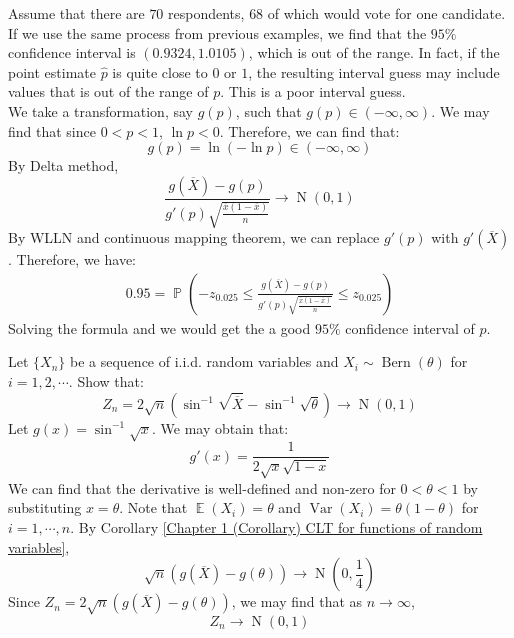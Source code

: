 \documentclass{huhtakm-template-book-v2}
\DeclareMathOperator{\prob}{\mathbb{P}}
\DeclareMathOperator{\E}{\mathbb{E}}
\DeclareMathOperator{\Var}{Var}
\DeclareMathOperator{\Bern}{Bern}
\DeclareMathOperator{\N}{N}
\begin{document}
\begin{eg}
	Assume that there are $70$ respondents, $68$ of which would vote for one candidate.\\
	If we use the same process from previous examples, we find that the $95\%$ confidence interval is $(0.9324,1.0105)$, which is out of the range. In fact, if the point estimate $\hat{p}$ is quite close to $0$ or $1$, the resulting interval guess may include values that is out of the range of $p$. This is a poor interval guess.\\
	We take a transformation, say $g(p)$, such that $g(p)\in(-\infty,\infty)$. We may find that since $0<p<1$, $\ln{p}<0$. Therefore, we can find that:
	\begin{equation*}
		g(p)=\ln(-\ln{p})\in(-\infty,\infty)
	\end{equation*}
	By Delta method,
	\begin{equation*}
		\frac{g(\overline{X})-g(p)}{g'(p)\sqrt{\frac{\overline{x}(1-\overline{x})}{n}}}\to\N(0,1)
	\end{equation*}
	By WLLN and continuous mapping theorem, we can replace $g'(p)$ with $g'(\overline{X})$. Therefore, we have:
	\begin{align*}
		0.95=\prob\left(-z_{0.025}\leq	\frac{g(\overline{X})-g(p)}{g'(p)\sqrt{\frac{\overline{x}(1-\overline{x})}{n}}}\leq z_{0.025}\right)
	\end{align*}
	Solving the formula and we would get the a good $95\%$ confidence interval of $p$.
\end{eg}
\begin{eg}
	Let $\{X_{n}\}$ be a sequence of i.i.d. random variables and $X_{i}\sim\Bern(\theta)$ for $i=1,2,\cdots$. Show that:
	\begin{equation*}
		Z_{n}=2\sqrt{n}\left(\sin^{-1}{\sqrt{\overline{X}}}-\sin^{-1}{\sqrt{\theta}}\right)\to\N(0,1)
	\end{equation*}
	Let $g(x)=\sin^{-1}{\sqrt{x}}$. We may obtain that:
	\begin{equation*}
		g'(x)=\frac{1}{2\sqrt{x}\sqrt{1-x}}
	\end{equation*}
	We can find that the derivative is well-defined and non-zero for $0<\theta<1$ by substituting $x=\theta$. Note that $\E(X_{i})=\theta$ and $\Var(X_{i})=\theta(1-\theta)$ for $i=1,\cdots,n$. By Corollary \ref{Chapter 1 (Corollary) CLT for functions of random variables},
	\begin{equation*}
		\sqrt{n}(g(\overline{X})-g(\theta))\to\N\left(0,\frac{1}{4}\right)
	\end{equation*}
	Since $Z_{n}=2\sqrt{n}(g(\overline{X})-g(\theta))$, we may find that as $n\to\infty$,
	\begin{equation*}
		Z_{n}\to\N(0,1)
	\end{equation*}
\end{eg}
\end{document}
